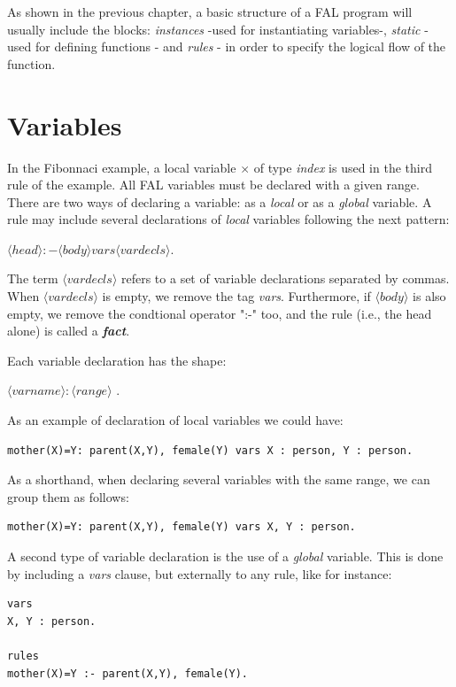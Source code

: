 \documentclass[a4paper,12pt]{report}
\begin{document}
	As shown in the previous chapter, a basic structure of a FAL program will usually include the blocks: \textit{instances} -used for instantiating variables-, \textit{static} - used for defining functions - and \textit{rules} - in order to specify the logical flow of the function.

\section{Variables}

	In the Fibonnaci example, a local variable $\times$ of type \textit{index} is used in the third rule of the example. All FAL variables must be declared with a given range. There are two ways of declaring a variable: as a \textit{local} or as a \textit{global} variable. A rule may include several declarations of \textit{local} variables following the next pattern:

$ \langle head \rangle :- \langle body \rangle  vars \langle vardecls \rangle $.

	The term $\langle vardecls \rangle $ refers to a set of variable declarations separated by commas. When $\langle vardecls \rangle $ is empty, we remove the tag \textit{vars}. Furthermore, if $\langle body \rangle $ is also empty, we remove the condtional operator ":-" too, and the rule (i.e., the head alone) is called a \textbf{\textit{fact}}.

Each variable declaration has the shape:

$\langle varname \rangle  : \langle range \rangle $ .

As an example of declaration of local variables we could have:
\begin{verbatim}
mother(X)=Y: parent(X,Y), female(Y) vars X : person, Y : person.
\end{verbatim}


As a shorthand, when declaring several variables with the same range, we can group them as follows:
\begin{verbatim}
mother(X)=Y: parent(X,Y), female(Y) vars X, Y : person.
\end{verbatim}

A second type of variable declaration is the use of a \textit{global} variable. This is done by including a \textit{vars} clause, but externally to any rule, like for instance:
\begin{verbatim}
vars
X, Y : person.

rules
mother(X)=Y :- parent(X,Y), female(Y).
\end{verbatim}
\end{document}

